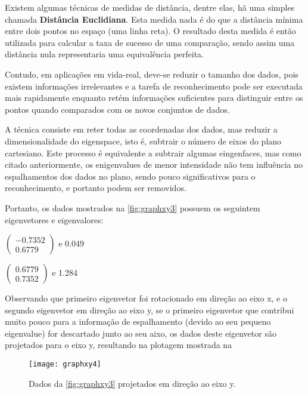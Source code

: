 Existem algumas técnicas de medidas de distância, dentre elas, hã uma simples chamada \textbf{Distância Euclidiana}. Esta medida nada é do que a distância mínima entre dois pontos no espaço (uma linha reta). O resultado desta medida é então utilizada para calcular a taxa de sucesso de uma comparação, sendo assim uma distância nula representaria uma equivalência perfeita.

Contudo, em aplicações em vida-real, deve-se reduzir o tamanho dos dados, pois existem informações irrelevantes e a tarefa de reconhecimento pode ser executada mais rapidamente enquanto retém informações suficientes para distinguir entre os pontos quando comparados com os novos conjuntos de dados.

A técnica consiste em reter todas as coordenadas dos dados, mas reduzir a dimensionalidade do eigenspace, isto é, subtrair o número de eixos do plano cartesiano. Este processo é equivalente a subtrair algumas eingenfaces, mas como citado anteriormente, os enigenvalues de menor intensidade não tem influência no espalhamentos dos dados no plano, sendo pouco significativos para o reconhecimento, e portanto podem ser removidos.

Portanto, os dados mostrados na  \autoref{fig:graphxy3} possuem os seguintem eigenvetores e eigenvalores:

\begin{center}
	$\begin{pmatrix} -0.7352 \\ 0.6779 \end{pmatrix}$  e 0.049
	
	$\begin{pmatrix} 0.6779 \\ 0.7352 \end{pmatrix}$  e 1.284
\end{center}

Observando que primeiro eigenvetor foi rotacionado em direção ao eixo x, e o segundo eigenvetor em direção ao eixo y, se o primeiro eigenvetor que contribui muito pouco para a informação de espalhamento (devido ao seu pequeno eigenvalue) for descartado junto ao seu aixo, os dados deste eigenvetor são projetados para o eixo y, resultando na plotagem mostrada na 

\begin{figure}[h]
	\centering
	\texttt{[image: graphxy4]}
	\caption{Dados da \autoref{fig:graphxy3} projetados em direção ao eixo y.}
	\label{fig:graphxy4}
\end{figure}



















